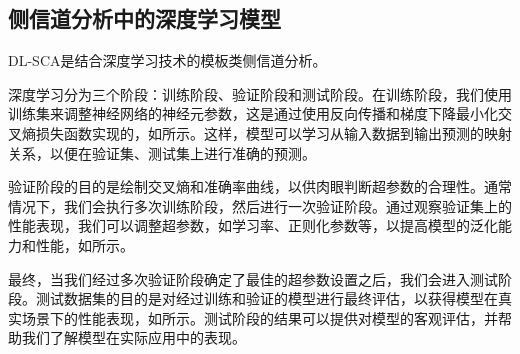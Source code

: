 {%
%	
	
	\subsection{侧信道分析中的深度学习模型}\label{subs:conceptdlsca}
	
	DL-SCA是结合深度学习技术的模板类侧信道分析。
	
	
	深度学习分为三个阶段：训练阶段、验证阶段和测试阶段。在训练阶段，我们使用训练集来调整神经网络的神经元参数，这是通过使用反向传播和梯度下降最小化交叉熵损失函数实现的，如所示。这样，模型可以学习从输入数据到输出预测的映射关系，以便在验证集、测试集上进行准确的预测。
	
	验证阶段的目的是绘制交叉熵和准确率曲线，以供肉眼判断超参数的合理性。通常情况下，我们会执行多次训练阶段，然后进行一次验证阶段。通过观察验证集上的性能表现，我们可以调整超参数，如学习率、正则化参数等，以提高模型的泛化能力和性能，如所示。
	
	最终，当我们经过多次验证阶段确定了最佳的超参数设置之后，我们会进入测试阶段。测试数据集的目的是对经过训练和验证的模型进行最终评估，以获得模型在真实场景下的性能表现，如所示。测试阶段的结果可以提供对模型的客观评估，并帮助我们了解模型在实际应用中的表现。
	
}
